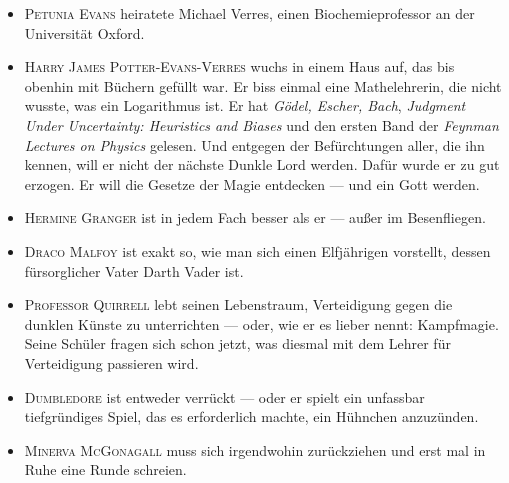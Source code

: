 \begin{itemize}
\item \textsc{Petunia Evans} heiratete Michael Verres, einen Biochemieprofessor an der Universität Oxford.
\item \textsc{Harry James Potter-Evans-Verres} wuchs in einem Haus auf, das bis obenhin mit Büchern gefüllt war. Er biss einmal eine Mathelehrerin, die nicht wusste, was ein Logarithmus ist. Er hat \emph{Gödel, Escher, Bach}, \emph{Judgment Under Uncertainty: Heuristics and Biases} und den ersten Band der \emph{Feynman Lectures on Physics} gelesen. Und entgegen der Befürchtungen aller, die ihn kennen, will er nicht der nächste Dunkle Lord werden. Dafür wurde er zu gut erzogen. Er will die Gesetze der Magie entdecken — und ein Gott werden.
\item \textsc{Hermine Granger} ist in jedem Fach besser als er — außer im Besenfliegen.
\item \textsc{Draco Malfoy} ist exakt so, wie man sich einen Elfjährigen vorstellt, dessen fürsorglicher Vater Darth Vader ist.
\item \textsc{Professor Quirrell} lebt seinen Lebenstraum, Verteidigung gegen die dunklen Künste zu unterrichten — oder, wie er es lieber nennt: Kampfmagie. Seine Schüler fragen sich schon jetzt, was diesmal mit dem Lehrer für Verteidigung passieren wird.
\item \textsc{Dumbledore} ist entweder verrückt — oder er spielt ein unfassbar tiefgründiges Spiel, das es erforderlich machte, ein Hühnchen anzuzünden.
\item \textsc{Minerva McGonagall} muss sich irgendwohin zurückziehen und erst mal in Ruhe eine Runde schreien.
\end{itemize}

